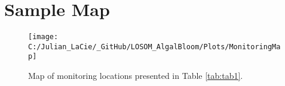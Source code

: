 \documentclass[]{interact}
\theoremstyle{plain}%
\theoremstyle{definition}
\theoremstyle{remark}
\newenvironment{Shaded}{\begin{snugshade}}{\end{snugshade}}
\newcommand{\AttributeTok}[1]{\textcolor[rgb]{0.77,0.63,0.00}{#1}}
\newcommand{\CommentTok}[1]{\textcolor[rgb]{0.56,0.35,0.01}{\textit{#1}}}
\newcommand{\FloatTok}[1]{\textcolor[rgb]{0.00,0.00,0.81}{#1}}
\newcommand{\FunctionTok}[1]{\textcolor[rgb]{0.00,0.00,0.00}{#1}}
\newcommand{\NormalTok}[1]{#1}
\newcommand{\SpecialCharTok}[1]{\textcolor[rgb]{0.00,0.00,0.00}{#1}}
\newcommand{\StringTok}[1]{\textcolor[rgb]{0.31,0.60,0.02}{#1}}
\begin{document}
\begin{Shaded}
\end{Shaded}

\newpage
\section{Sample Map}

\begin{figure}[H]

{\centering \texttt{[image: C:/Julian\_LaCie/\_GitHub/LOSOM\_AlgalBloom/Plots/MonitoringMap]} 

}

\caption{\label{fig:map}Map of monitoring locations presented in Table \ref{tab:tab1}.}\label{fig:unnamed-chunk-11}
\end{figure}

\newpage



\end{document}
